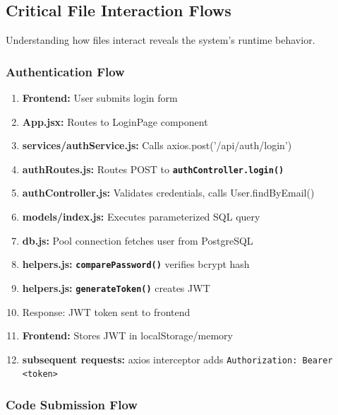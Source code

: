 \documentclass[12pt,a4paper,oneside]{article}
\newcommand{\funcname}[1]{\texttt{\textbf{#1}}}
\begin{document}
\newpage

\subsection{Critical File Interaction Flows}

Understanding how files interact reveals the system's runtime behavior.

\subsubsection{Authentication Flow}

\begin{enumerate}
    \item \textbf{Frontend:} User submits login form
    \item \textbf{App.jsx:} Routes to LoginPage component
    \item \textbf{services/authService.js:} Calls axios.post('/api/auth/login')
    \item \textbf{authRoutes.js:} Routes POST to \funcname{authController.login()}
    \item \textbf{authController.js:} Validates credentials, calls User.findByEmail()
    \item \textbf{models/index.js:} Executes parameterized SQL query
    \item \textbf{db.js:} Pool connection fetches user from PostgreSQL
    \item \textbf{helpers.js:} \funcname{comparePassword()} verifies bcrypt hash
    \item \textbf{helpers.js:} \funcname{generateToken()} creates JWT
    \item Response: JWT token sent to frontend
    \item \textbf{Frontend:} Stores JWT in localStorage/memory
    \item \textbf{subsequent requests:} axios interceptor adds \texttt{Authorization: Bearer <token>}
\end{enumerate}

\subsubsection{Code Submission Flow}
\end{document}
